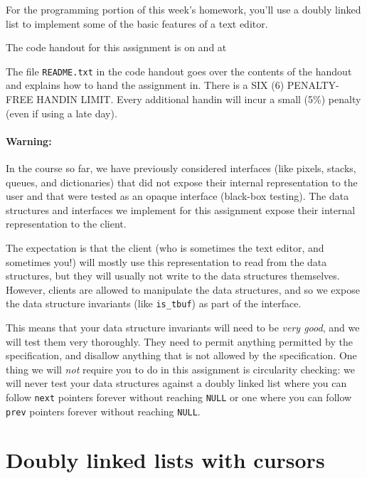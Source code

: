 \documentclass[12pt]{exam}
\begin{document}
\hwTitle

\noindent
For the programming portion of this week's homework, you'll use a doubly
linked list to implement some of the basic features of a text editor.

\bigskip
\noindent
The code handout for this assignment is on \autolab{} and at
\begin{center}
\end{center}
The file \lstinline'README.txt' in the code handout goes over the contents
of the handout and explains how to hand the assignment in.
There is a SIX (6) PENALTY-FREE HANDIN LIMIT.
Every additional handin will incur a small (5\%) penalty (even if
using a late day).


\paragraph{Warning:}

In the course so far, we have previously considered interfaces (like
pixels, stacks, queues, and dictionaries) that did not expose their internal
representation to the user and that were tested as an opaque interface
(black-box testing). The data structures and interfaces we implement
for this assignment expose their internal representation to the
client.

The expectation is that the client (who is sometimes the text editor,
and sometimes you!) will mostly use this representation to read from
the data structures, but they will usually not write to the data
structures themselves.  However, clients are allowed to manipulate the
data structures, and so we expose the data structure invariants (like
\lstinline'is_tbuf') as part of the interface.

This means that your data structure invariants will need to be
\emph{very good}, and we will test them very thoroughly. They need to
permit anything permitted by the specification, and disallow anything
that is not allowed by the specification. One thing we will
\emph{not} require you to do in this assignment is circularity checking: we
will never test your data structures against a doubly linked list
where you can follow \lstinline'next' pointers forever without reaching
\lstinline'NULL' or one where you can follow \lstinline'prev' pointers forever
without reaching \lstinline'NULL'.


\clearpage
\section{Doubly linked lists with cursors}
\end{document}
